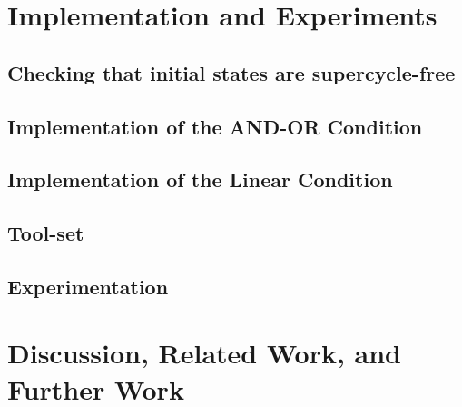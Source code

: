 \documentclass[11pt]{article}
\begin{document}
\section{Implementation and Experiments}
\label{s:impl}

   \subsection{Checking that initial states are supercycle-free}
   \label{s:initSCFree}
   


   \subsection{Implementation of the AND-OR Condition}
   \label{s:implANDOR}
   

   \subsection{Implementation of the Linear Condition}
   \label{s:implLin}
   


   \subsection{Tool-set}
  \label{s:experiments}
   

   \subsection{Experimentation}
  \label{s:experiments}
   




\clearpage
\section{Discussion, Related Work, and Further Work}
\label{s:discussion}








%
%
\end{document}
